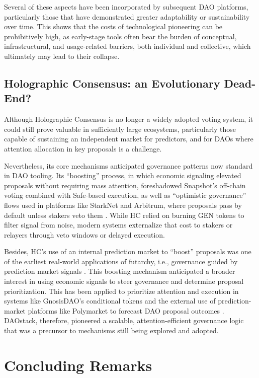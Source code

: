 \documentclass[10pt,lineno]{wlpeerj}
\begin{document}
Several of these aspects have been incorporated by subsequent DAO platforms, particularly those that have demonstrated greater adaptability or sustainability over time. This shows that the costs of technological pioneering can be prohibitively high, as early-stage tools often bear the burden of conceptual, infrastructural, and usage-related barriers, both individual and collective, which ultimately may lead to their collapse.


\subsection{Holographic Consensus: an Evolutionary Dead-End?}

Although Holographic Consensus is no longer a widely adopted voting system, it could still prove valuable in sufficiently large ecosystems, particularly those capable of sustaining an independent market for predictors, and for DAOs where attention allocation in key proposals is a challenge. 

Nevertheless,  its core mechanisms anticipated governance patterns now standard in DAO tooling. Its “boosting” process, in which economic signaling elevated proposals without requiring mass attention, foreshadowed Snapshot’s off-chain voting combined with Safe-based execution, as well as “optimistic governance” flows used in platforms like StarkNet and Arbitrum, where proposals pass by default unless stakers veto them \citep{donno2022optimistic}. While HC relied on burning GEN tokens to filter signal from noise, modern systems externalize that cost to stakers or relayers through veto windows or delayed execution. 

Besides, HC’s use of an internal prediction market to “boost” proposals was one of the earliest real-world applications of futarchy, i.e., governance guided by prediction market signals \citep{hanson2013shall}. This boosting mechanism anticipated a broader interest in using economic signals to steer governance and determine proposal prioritization. This has been applied to prioritize attention and execution in systems like GnosisDAO's conditional tokens \citep{metalamp_exploring_2024} and the external use of prediction-market platforms like Polymarket to forecast DAO proposal outcomes \citep{buterin_vitalik_2024}.  DAOstack, therefore, pioneered a scalable, attention-efficient governance logic that was a precursor to mechanisms still being explored and adopted. 


\section{Concluding Remarks}
\end{document}
